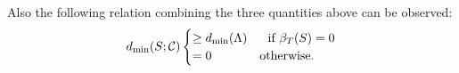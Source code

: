 \vspace*{-3mm}
Also the following relation combining the three quantities above can be observed:
\begin{equation}
d_{\mathrm{min}}(S;\mathcal{C}) \begin{cases} \geq  d_{\mathrm{min}}(\Lambda) &~~\text{if } \beta_T(S)=0 \\
=0 & \mbox{otherwise.}  \end{cases}
\label{eqn:LatticeTsumconnection}
\end{equation}


